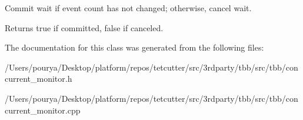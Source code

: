 Commit wait if event count has not changed; otherwise, cancel wait. 

Returns true if committed, false if canceled. 

The documentation for this class was generated from the following files\+:\begin{DoxyCompactItemize}
\item 
/\+Users/pourya/\+Desktop/platform/repos/tetcutter/src/3rdparty/tbb/src/tbb/concurrent\+\_\+monitor.\+h\item 
/\+Users/pourya/\+Desktop/platform/repos/tetcutter/src/3rdparty/tbb/src/tbb/concurrent\+\_\+monitor.\+cpp\end{DoxyCompactItemize}
